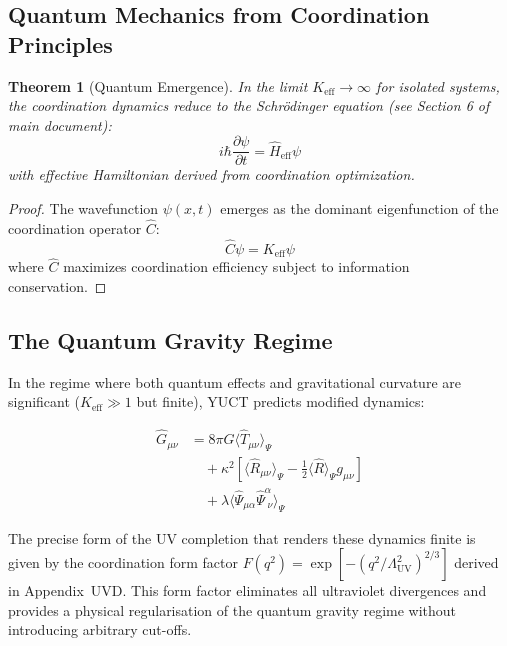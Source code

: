 \documentclass[12pt,a4paper]{article}
\newcommand{\eff}{\text{eff}}               %
\newtheorem{theorem}{Theorem}[section]
\theoremstyle{remark}
\newcommand{\Keff}{K_{\mathrm{eff}}}
\begin{document}
	\subsection{Quantum Mechanics from Coordination Principles}
	
	\begin{theorem}[Quantum Emergence]
		In the limit $\Keff \to \infty$ for isolated systems, the coordination dynamics reduce to the Schrödinger equation (see Section 6 of main document):
		\[
		i\hbar \frac{\partial \psi}{\partial t} = \hat{H}_{\eff} \psi
		\]
		with effective Hamiltonian derived from coordination optimization.
	\end{theorem}
	
	\begin{proof}
		The wavefunction $\psi(x,t)$ emerges as the dominant eigenfunction of the coordination operator $\hat{C}$:
		\[
		\hat{C} \psi = \Keff \psi
		\]
		where $\hat{C}$ maximizes coordination efficiency subject to information conservation.
	\end{proof}
	
	\subsection{The Quantum Gravity Regime}
	
	In the regime where both quantum effects and gravitational curvature are significant ($\Keff \gg 1$ but finite), YUCT predicts modified dynamics:
	
	\begin{equation}
		\begin{aligned}
			\hat{G}_{\mu\nu} &= 8\pi G \langle \hat{T}_{\mu\nu} \rangle_{\Psi} \\
			&\quad + \kappa^2 \left[ \langle \hat{R}_{\mu\nu} \rangle_{\Psi} - \frac{1}{2} \langle \hat{R} \rangle_{\Psi} g_{\mu\nu} \right] \\
			&\quad + \lambda \langle \hat{\Psi}_{\mu\alpha} \hat{\Psi}^{\alpha}_{\;\nu} \rangle_{\Psi}
		\end{aligned}
	\end{equation}
	
	The precise form of the UV completion that renders these dynamics finite is
	given by the coordination form factor $F(q^2)=\exp[-(q^2/\Lambda_{\mathrm{UV}}^2)^{2/3}]$
	derived in Appendix~UVD. This form factor eliminates all ultraviolet divergences
	and provides a physical regularisation of the quantum gravity regime without
	introducing arbitrary cut-offs.
	
\end{document}
